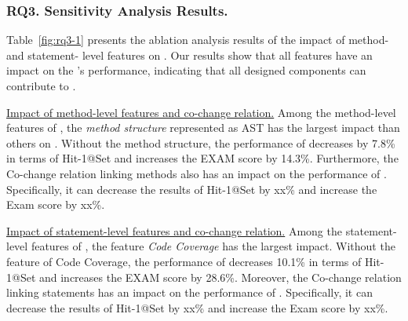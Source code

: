 \subsubsection{\bf RQ3. Sensitivity Analysis Results.}

Table~\ref{fig:rq3-1} presents the ablation analysis results of the impact of method- and statement- level features on {\tool}. Our results show that all features have an impact on the {\tool}'s performance, indicating that all designed components can contribute to {\tool}. 

\underline{Impact of method-level features and co-change relation.}
Among the method-level features of {\tool}, the {\it method structure} represented as AST has the largest impact than others on {\tool}. Without the method structure, the performance of {\tool} decreases by 7.8\% in terms of Hit-1@Set and increases the EXAM score by 14.3\%. 
Furthermore, the Co-change relation linking methods also has an impact on the performance of {\tool}. Specifically, it can decrease the results of Hit-1@Set by xx\% and increase the Exam score by xx\%.

\underline{Impact of statement-level features and co-change relation.}
Among the statement-level features of {\tool}, the feature {\it Code Coverage} has the largest impact. Without the feature of Code Coverage, the performance of {\tool} decreases 10.1\% in terms of Hit-1@Set and increases the EXAM score by 28.6\%. Moreover, the Co-change relation linking statements has an impact on the performance of {\tool}. Specifically, it can decrease the results of Hit-1@Set by xx\% and increase the Exam score by xx\%.


